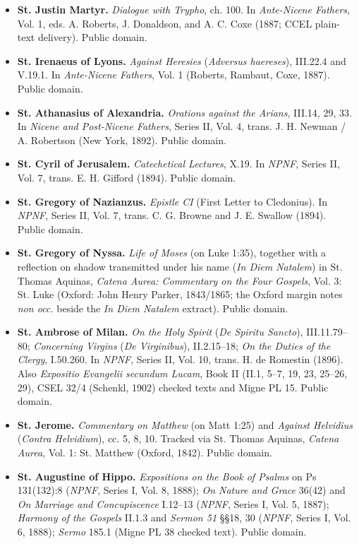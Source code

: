 \begin{itemize}
  \item \textbf{St. Justin Martyr.} \textit{Dialogue with Trypho}, ch. 100. In \textit{Ante-Nicene Fathers}, Vol. 1, eds. A. Roberts, J. Donaldson, and A. C. Coxe (1887; CCEL plain-text delivery). Public domain.
  \item \textbf{St. Irenaeus of Lyons.} \textit{Against Heresies} (\textit{Adversus haereses}), III.22.4 and V.19.1. In \textit{Ante-Nicene Fathers}, Vol. 1 (Roberts, Rambaut, Coxe, 1887). Public domain.
  \item \textbf{St. Athanasius of Alexandria.} \textit{Orations against the Arians}, III.14, 29, 33. In \textit{Nicene and Post-Nicene Fathers}, Series II, Vol. 4, trans. J. H. Newman / A. Robertson (New York, 1892). Public domain.
  \item \textbf{St. Cyril of Jerusalem.} \textit{Catechetical Lectures}, X.19. In \textit{NPNF}, Series II, Vol. 7, trans. E. H. Gifford (1894). Public domain.
  \item \textbf{St. Gregory of Nazianzus.} \textit{Epistle CI} (First Letter to Cledonius). In \textit{NPNF}, Series II, Vol. 7, trans. C. G. Browne and J. E. Swallow (1894). Public domain.
  \item \textbf{St. Gregory of Nyssa.} \textit{Life of Moses} (on Luke 1:35), together with a reflection on shadow transmitted under his name (\textit{In Diem Natalem}) in St. Thomas Aquinas, \textit{Catena Aurea: Commentary on the Four Gospels}, Vol. 3: St. Luke (Oxford: John Henry Parker, 1843/1865; the Oxford margin notes \textit{non occ.} beside the \textit{In Diem Natalem} extract). Public domain.
  \item \textbf{St. Ambrose of Milan.} \textit{On the Holy Spirit} (\textit{De Spiritu Sancto}), III.11.79--80; \textit{Concerning Virgins} (\textit{De Virginibus}), II.2.15--18; \textit{On the Duties of the Clergy}, I.50.260. In \textit{NPNF}, Series II, Vol. 10, trans. H. de Romestin (1896). Also \textit{Expositio Evangelii secundum Lucam}, Book II (II.1, 5--7, 19, 23, 25--26, 29), CSEL 32/4 (Schenkl, 1902) checked texts and Migne PL 15. Public domain.
  \item \textbf{St. Jerome.} \textit{Commentary on Matthew} (on Matt 1:25) and \textit{Against Helvidius} (\textit{Contra Helvidium}), cc. 5, 8, 10. Tracked via St. Thomas Aquinas, \textit{Catena Aurea}, Vol. 1: St. Matthew (Oxford, 1842). Public domain.
  \item \textbf{St. Augustine of Hippo.} \textit{Expositions on the Book of Psalms} on Ps 131(132):8 (\textit{NPNF}, Series I, Vol. 8, 1888); \textit{On Nature and Grace} 36(42) and \textit{On Marriage and Concupiscence} I.12--13 (\textit{NPNF}, Series I, Vol. 5, 1887); \textit{Harmony of the Gospels} II.1.3 and \textit{Sermon 51} \S\S 18, 30 (\textit{NPNF}, Series I, Vol. 6, 1888); \textit{Sermo} 185.1 (Migne PL 38 checked text). Public domain.

\end{itemize}
